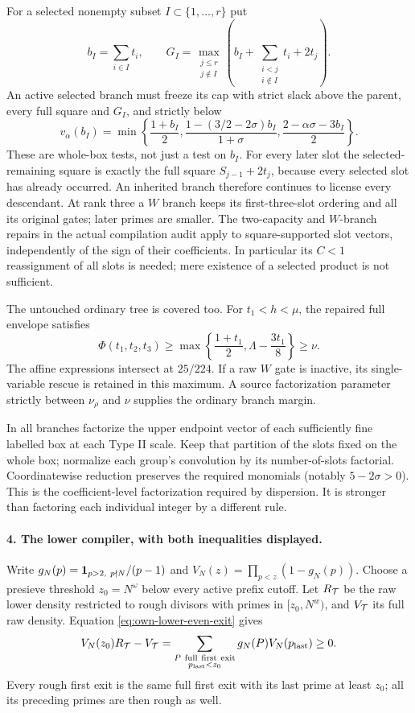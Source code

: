 For a selected nonempty subset \(I\subset\{1,\ldots,r\}\) put
\[
 b_I=\sum_{i\in I}t_i,\qquad
 G_I=\max_{\substack{j\le r\\j\notin I}}
 \left(b_I+\sum_{\substack{i<j\\i\notin I}}t_i+2t_j\right).
\]
An active selected branch must freeze its cap with strict slack above
the parent, every full square and \(G_I\), and strictly below
\[
 v_\alpha(b_I)=
 \min\left\{\frac{1+b_I}{2},
 \frac{1-(3/2-2\sigma)b_I}{1+\sigma},
 \frac{2-\alpha\sigma-3b_I}{2}\right\}.
\]
These are whole-box tests, not just a test on \(b_I\).
For every later slot the selected-remaining square is exactly the full
square \(S_{j-1}+2t_j\), because every selected slot has already occurred.
An inherited branch therefore continues to license every descendant.
At rank three a \(W\) branch keeps its first-three-slot ordering and
all its original gates; later primes are smaller. The two-capacity
and \(W\)-branch repairs in the actual compilation audit apply to
square-supported slot vectors, independently of the sign of their
coefficients. In particular its \(C<1\) reassignment of all slots is
needed; mere existence of a selected product is not sufficient.

The untouched ordinary tree is covered too. For \(t_1<h<\mu\),
the repaired full envelope satisfies
\[
 \Phi(t_1,t_2,t_3)\ge
 \max\left\{\frac{1+t_1}{2},\Lambda-\frac{3t_1}{8}\right\}
 \ge\nu.
\]
The affine expressions intersect at \(25/224\). If a raw \(W\) gate
is inactive, its single-variable rescue is retained in this maximum.
A source factorization parameter strictly between \(\nu_\rho\) and
\(\nu\) supplies the ordinary branch margin.

In all branches factorize the upper endpoint vector of each sufficiently
fine labelled box at each Type II scale. Keep that partition of the
slots fixed on the whole box; normalize each group's convolution by
its number-of-slots factorial. Coordinatewise reduction preserves
the required monomials (notably \(5-2\sigma>0\)). This is the
coefficient-level factorization required by dispersion. It is stronger
than factoring each individual integer by a different rule.

\paragraph{4. The lower compiler, with both inequalities displayed.}
Write \(g_N(p)={\bf1}_{p>2,\ p\nmid N}/(p-1)\) and
\(V_N(z)=\prod_{p<z}(1-g_N(p))\). Choose a presieve threshold
\(z_0=N^\omega\) below every active prefix cutoff. Let
\(R_{\cal T}\) be the raw lower density restricted to rough divisors
with primes in \([z_0,N^w)\), and \(V_{\cal T}\) its full raw density.
Equation \eqref{eq:own-lower-even-exit} gives
\begin{equation}\label{eq:own-lower-rough-projection}
 V_N(z_0)R_{\cal T}-V_{\cal T}
 =\sum_{\substack{P\ {\rm full\ first\ exit}\\p_{\rm last}<z_0}}
       g_N(P)V_N(p_{\rm last})\ge0.
\end{equation}
Every rough first exit is the same full first exit with its last prime
at least \(z_0\); all its preceding primes are then rough as well.


